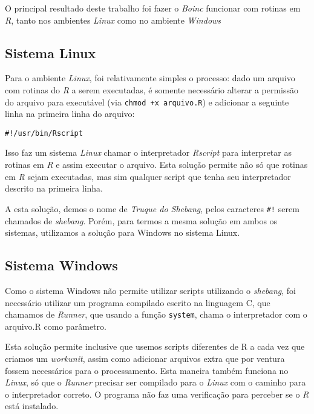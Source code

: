 O principal resultado deste trabalho foi fazer o \emph{Boinc} funcionar com rotinas em \emph{R}, tanto
nos ambientes \emph{Linux} como no ambiente \emph{Windows} %

\subsection{Sistema Linux}

Para o ambiente \emph{Linux}, foi relativamente simples o processo: dado um arquivo com rotinas
do \emph{R} a serem executadas, é somente necessário alterar a permissão do arquivo para executável 
(via \verb#chmod +x arquivo.R#) e adicionar a seguinte linha na primeira linha do arquivo:

\begin{verbatim}
#!/usr/bin/Rscript
\end{verbatim}

Isso faz um sistema \emph{Linux} chamar o interpretador \emph{Rscript} para interpretar as rotinas 
em \emph{R} e assim executar o arquivo. Esta solução permite não só que rotinas em \emph{R} sejam
executadas, mas sim qualquer script que tenha seu interpretador descrito na primeira linha.

A esta solução, demos o nome de \emph{Truque do Shebang}, pelos caracteres \verb'#!' serem chamados
de \emph{shebang}. Porém, para termos a mesma solução em ambos os sistemas, utilizamos a solução para
Windows no sistema Linux.

\subsection{Sistema Windows} %

Como o sistema Windows não permite utilizar scripts utilizando o \emph{shebang}, foi necessário 
utilizar um programa compilado escrito na linguagem C, que chamamos de \emph{Runner}, 
que usando a função \verb#system#, chama o interpretador com o arquivo.R como parâmetro. 

Esta solução permite inclusive que usemos scripts diferentes de R a cada vez que criamos um 
\emph{workunit}, assim como adicionar arquivos extra que por ventura fossem necessários para
o processamento. Esta maneira também funciona no \emph{Linux}, só que o \emph{Runner} precisar
ser compilado para o \emph{Linux} com o caminho para o interpretador correto. O programa não faz
uma verificação para perceber se o \emph{R} está instalado. 

